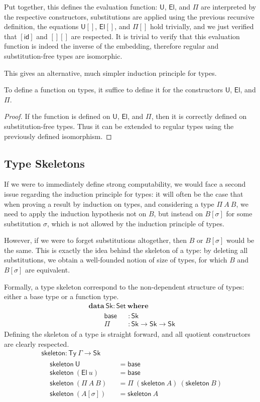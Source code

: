 \documentclass[a4paper,english]{lipics-v2019}
\newcommand{\agdaSymb}[1]{\mathsf{#1}}
\newcommand{\agdaKW}[1]{\mathbf{#1}}
\newcommand{\ind}{\hspace{1em}}
\newcommand{\data}{\agdaKW{data}}
\newcommand{\where}{\agdaKW{where}}
\newcommand{\Set}{\agdaSymb{Set}}
\newcommand{\Ty}{\agdaSymb{Ty}}
\newcommand{\id}{\agdaSymb{id}}
\newcommand{\U}{\agdaSymb{U}}
\newcommand{\El}{\agdaSymb{El}}
\newcommand{\Sk}{\agdaSymb{Sk}}
\newcommand{\base}{\agdaSymb{base}}
\newcommand{\skel}{\agdaSymb{skeleton}}
\begin{document}
Put together, this defines the evaluation function: $\U$, $\El$, and $\Pi$ are
interpreted by the respective constructors, substitutions are applied using the
previous recursive definition, the equations $\U[]$, $\El[]$, and $\Pi[]$ hold
trivially, and we just verified that $[\id]$ and $[][]$ are respected.
It is trivial to verify that this evaluation function is indeed the inverse of
the embedding, therefore regular and substitution-free types are isomorphic.

This gives an alternative, much simpler induction principle for types.
\begin{lemma}
  \label{lem:typeInduction}
  To define a function on types, it suffice to define it for the constructors
  $\U$, $\El$, and $\Pi$.
\end{lemma}
\begin{proof}
  If the function is defined on $\U$, $\El$, and $\Pi$, then it is correctly
  defined on substitution-free types. Thus it can be extended to regular types
  using the previously defined isomorphism.
\end{proof}

\subsection{Type Skeletons}
If we were to immediately define strong computability, we would face a second
issue regarding the induction principle for types: it will often be the case
that when proving a result by induction on types, and considering a type
$\Pi\ A\ B$, we need to apply the induction hypothesis not on $B$, but instead
on $B[\sigma]$ for some substitution $\sigma$, which is not allowed by the
induction principle of types.

However, if we were to forget substitutions altogether, then $B$ or $B[\sigma]$
would be the same. This is exactly the idea behind the skeleton of a type:
by deleting all substitutions, we obtain a well-founded notion of size of types,
for which $B$ and $B[\sigma]$ are equivalent.

Formally, a type skeleton correspond to the non-dependent structure of types:
either a base type or a function type.
\begin{align*}
  & \data\ \Sk : \Set\ \where \\ & \ind
  \begin{alignedat}{2}
    & \base && : \Sk \\
    & \Pi && : \Sk \to \Sk \to \Sk
  \end{alignedat}
\end{align*}
Defining the skeleton of a type is straight forward, and all quotient
constructors are clearly respected.
\begin{align*}
  & \skel : \Ty\ \Gamma \to \Sk \\ &
  \begin{alignedat}{2}
    & \skel\ \U && = \base \\
    & \skel\ (\El\ u) && = \base \\
    & \skel\ (\Pi\ A\ B) && = \Pi\ (\skel\ A)\ (\skel\ B) \\
    & \skel\ (A[\sigma]) && = \skel\ A
  \end{alignedat}
\end{align*}
\end{document}
